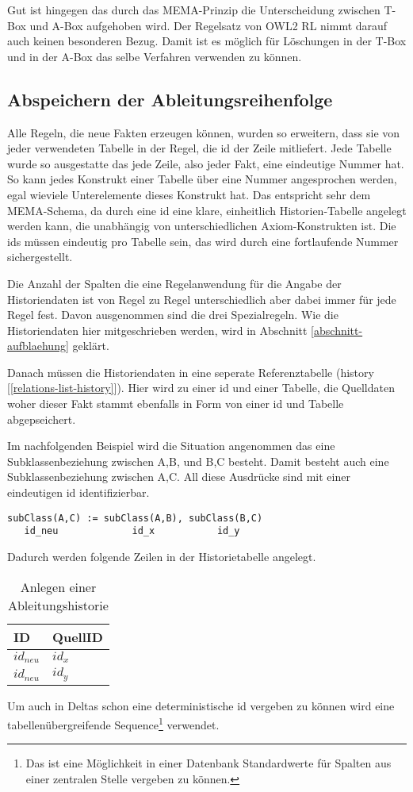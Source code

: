 Gut ist hingegen das durch das MEMA-Prinzip die Unterscheidung zwischen T-Box und A-Box aufgehoben wird. Der Regelsatz von OWL2 RL nimmt darauf auch keinen besonderen Bezug. Damit ist es möglich für Löschungen in der T-Box und in der A-Box das selbe Verfahren verwenden zu können.

\subsection{Abspeichern der Ableitungsreihenfolge}
Alle Regeln, die neue Fakten erzeugen können, wurden so erweitern, dass sie von jeder verwendeten Tabelle in der Regel, die id der Zeile mitliefert. Jede Tabelle wurde so ausgestatte das jede Zeile, also jeder Fakt, eine eindeutige Nummer hat. So kann jedes Konstrukt einer Tabelle über eine Nummer angesprochen werden, egal wieviele Unterelemente dieses Konstrukt hat. Das entspricht sehr dem MEMA-Schema, da durch eine id eine klare, einheitlich Historien-Tabelle angelegt werden kann, die unabhängig von unterschiedlichen Axiom-Konstrukten ist. Die ids müssen eindeutig pro Tabelle sein, das wird durch eine fortlaufende Nummer sichergestellt.

Die Anzahl der Spalten die eine Regelanwendung für die Angabe der Historiendaten ist von Regel zu Regel unterschiedlich aber dabei immer für jede Regel fest. Davon ausgenommen sind die drei Spezialregeln. Wie die Historiendaten hier mitgeschrieben werden, wird in Abschnitt \ref{abschnitt-aufblaehung} geklärt.

Danach müssen die Historiendaten in eine seperate Referenztabelle (history [\ref{relations-list-history}]). Hier wird zu einer id und einer Tabelle, die Quelldaten woher dieser Fakt stammt ebenfalls in Form von einer id und Tabelle abgepseichert.

Im nachfolgenden Beispiel wird die Situation angenommen das eine Subklassenbeziehung zwischen A,B, und B,C besteht. Damit besteht auch eine Subklassenbeziehung zwischen A,C. All diese Ausdrücke sind mit einer eindeutigen id identifizierbar.
\begin{verbatim}
subClass(A,C) := subClass(A,B), subClass(B,C)
   id_neu             id_x           id_y
\end{verbatim}

Dadurch werden folgende Zeilen in der Historietabelle angelegt.

\begin{table}[htb]
\begin{center}
\begin{tabular}{l|l}
ID & QuellID \\ \hline
$id_{neu}$ & $id_x$ \\
$id_{neu}$ & $id_y$
\end{tabular}
\end{center}
\caption{Anlegen einer Ableitungshistorie}
\label{table-inference-history}
\end{table}
Um auch in Deltas schon eine deterministische id vergeben zu können wird eine tabellenübergreifende Sequence\footnote{Das ist eine Möglichkeit in einer Datenbank Standardwerte für Spalten aus einer zentralen Stelle vergeben zu können.} verwendet.

